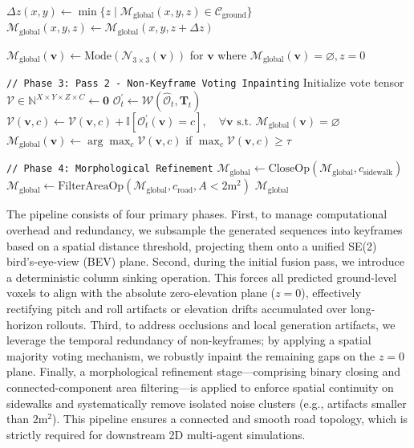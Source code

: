 \begin{algorithm}[h]
\begin{algorithmic}[1]
\State $\Delta z(x,y) \gets \min \{ z \mid \mathcal{M}_{\text{global}}(x,y,z) \in \mathcal{C}_{\text{ground}} \}$
\State $\mathcal{M}_{\text{global}}(x,y,z) \gets \mathcal{M}_{\text{global}}(x,y, z + \Delta z)$ 

\State $\mathcal{M}_{\text{global}}(\mathbf{v}) \gets \text{Mode}(\mathcal{N}_{3\times3}(\mathbf{v}))$ for $\mathbf{v}$ where $\mathcal{M}_{\text{global}}(\mathbf{v}) = \varnothing, z=0$

\State \texttt{// Phase 3: Pass 2 - Non-Keyframe Voting Inpainting}
\State Initialize vote tensor $\mathcal{V} \in \mathbb{N}^{X \times Y \times Z \times C} \gets \mathbf{0}$
    \State $\mathcal{O}_t^{\prime} \gets \mathcal{W}(\hat{\mathcal{O}}_t, \mathbf{T}_t)$
    \State $\mathcal{V}(\mathbf{v}, c) \gets \mathcal{V}(\mathbf{v}, c) + \mathbb{I}[\mathcal{O}^{\prime}_t(\mathbf{v}) = c], \quad \forall \mathbf{v} \text{ s.t. } \mathcal{M}_{\text{global}}(\mathbf{v}) = \varnothing$
\EndFor
\State $\mathcal{M}_{\text{global}}(\mathbf{v}) \gets \arg\max_c \mathcal{V}(\mathbf{v}, c)$ if $\max_c \mathcal{V}(\mathbf{v}, c) \ge \tau$

\State \texttt{//   Phase 4: Morphological Refinement}
\State $\mathcal{M}_{\text{global}} \gets \text{CloseOp}(\mathcal{M}_{\text{global}}, c_{\text{sidewalk}})$ 
\State $\mathcal{M}_{\text{global}} \gets \text{FilterAreaOp}(\mathcal{M}_{\text{global}}, c_{\text{road}}, A < 2\text{m}^2)$ 
\State \Return $\mathcal{M}_{\text{global}}$
\end{algorithmic}
\end{algorithm}


The pipeline consists of four primary phases. First, to manage computational overhead and redundancy, we subsample the generated sequences into keyframes based on a spatial distance threshold, projecting them onto a unified SE(2) bird's-eye-view (BEV) plane. Second, during the initial fusion pass, we introduce a deterministic column sinking operation. This forces all predicted ground-level voxels to align with the absolute zero-elevation plane ($z=0$), effectively rectifying pitch and roll artifacts or elevation drifts accumulated over long-horizon rollouts. Third, to address occlusions and local generation artifacts, we leverage the temporal redundancy of non-keyframes; by applying a spatial majority voting mechanism, we robustly inpaint the remaining gaps on the $z=0$ plane. Finally, a morphological refinement stage—comprising binary closing and connected-component area filtering—is applied to enforce spatial continuity on sidewalks and systematically remove isolated noise clusters (e.g., artifacts smaller than $2\text{m}^2$). This pipeline ensures a connected and smooth road topology, which is strictly required for downstream 2D multi-agent simulations.



